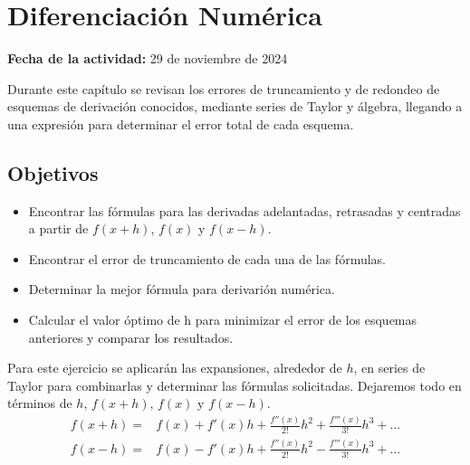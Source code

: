 \documentclass[../portafolio.tex]{subfiles}
\begin{document}
\chapter{Diferenciación Numérica}
\label{guia:2_derivadas_8}
\hfill \textbf{Fecha de la actividad:} 29 de noviembre de 2024

\medskip

Durante este capítulo se revisan los errores de truncamiento y de redondeo de esquemas de derivación conocidos, mediante series de Taylor y álgebra, llegando a una expresión para determinar el error total de cada esquema.

\section*{Objetivos}
\begin{itemize}
\item Encontrar las fórmulas para las derivadas adelantadas, retrasadas y centradas a partir de $f(x+h)$, $f(x)$ y $f(x-h)$.
\item Encontrar el error de truncamiento de cada una de las fórmulas.
\item Determinar la mejor fórmula para derivarión numérica.
\item Calcular el valor óptimo de h para minimizar el error de los esquemas anteriores y comparar los resultados.
\end{itemize}
\medskip
Para este ejercicio se aplicarán las expansiones, alrededor de $h$, en series de Taylor para combinarlas y determinar las fórmulas solicitadas. Dejaremos todo en términos de $h$, $f(x+h)$, $f(x)$ y $f(x-h)$.
\begin{align}
f(x+h)=&f(x)+ f'(x)h + \frac{f''(x)}{2!}h^2 + \frac{f'''(x)}{3!}h^3 +...\\
f(x-h)=&f(x)-  f'(x)h + \frac{f''(x)}{2!}h^2 -\frac{f'''(x)}{3!}h^3+... 
\end{align}
\end{document}
